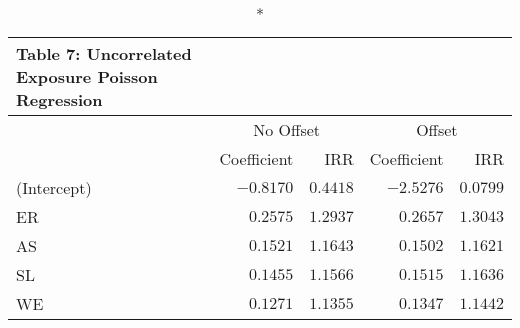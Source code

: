 \begin{longtable}{l|rrrr}
\caption*{
{\large Table 7: Uncorrelated Exposure Poisson Regression}
} \\ 
\toprule
\multicolumn{1}{l}{} & \multicolumn{2}{c}{No Offset} & \multicolumn{2}{c}{Offset} \\ 
\cmidrule(lr){2-3} \cmidrule(lr){4-5}
\multicolumn{1}{l}{} & Coefficient & IRR & Coefficient & IRR \\ 
\midrule
(Intercept) & $-0.8170$ & $0.4418$ & $-2.5276$ & $0.0799$ \\ 
ER & $0.2575$ & $1.2937$ & $0.2657$ & $1.3043$ \\ 
AS & $0.1521$ & $1.1643$ & $0.1502$ & $1.1621$ \\ 
SL & $0.1455$ & $1.1566$ & $0.1515$ & $1.1636$ \\ 
WE & $0.1271$ & $1.1355$ & $0.1347$ & $1.1442$ \\ 
\bottomrule
\end{longtable}


